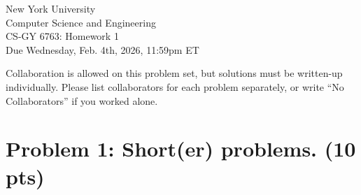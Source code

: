 \documentclass[11pt]{article}
\begin{document}
\begin{center}
	{\LARGE New York University}\\[6pt]
	{\large Computer Science and Engineering}\\[12pt]
	{\Large CS-GY 6763: Homework 1}\\[6pt]
	{\normalsize Due Wednesday, Feb. 4th, 2026, 11:59pm ET}
\end{center}

\noindent Collaboration is allowed on this problem set, but solutions must be written-up individually. Please list collaborators for each problem separately, or write ``No Collaborators'' if you worked alone.

\section*{Problem 1: Short(er) problems. (10 pts)}
\end{document}
